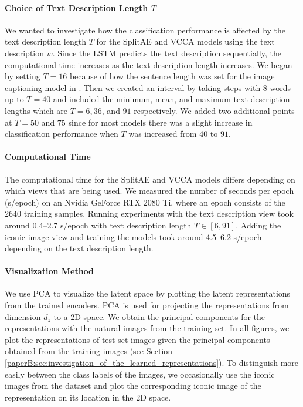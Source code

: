 \vspace{-3mm}
\paragraph{Choice of Text Description Length $T$} We wanted to investigate how the classification performance is affected by the text description length $T$ for the SplitAE and VCCA models using the text description $w$. Since the LSTM predicts the text description sequentially, the computational time increases as the text description length increases. We began by setting $T = 16$ because of how the sentence length was set for the image captioning model in . Then we created an interval by taking steps with 8 words up to $T=40$ and included the minimum, mean, and maximum text description lengths which are $T=6, 36$, and $91$ respectively. We added two additional points at $T=50$ and $75$ since for most models there was a slight increase in classification performance when $T$ was increased from $40$ to $91$. 

\vspace{-3mm}
\paragraph{Computational Time} The computational time for the SplitAE and VCCA models differs depending on which views that are being used. We measured the number of seconds per epoch (s/epoch) on an Nvidia GeForce RTX 2080 Ti, where an epoch consists of the 2640 training samples. Running experiments with the text description view 
took around 0.4--2.7 s/epoch with text description length $T \in [6, 91]$. Adding the iconic image view and training the models 
took around 4.5--6.2 s/epoch depending on the text description length.

\vspace{-3mm}
\paragraph{Visualization Method} We use PCA to visualize the latent space by plotting the latent representations from the trained encoders. PCA is used for projecting the representations from dimension $d_{z}$ to a 2D space. We obtain the principal components for the representations with the natural images from the training set. In all figures, we plot the representations of test set images given the principal components obtained from the training images (see Section \ref{paperB:sec:investigation_of_the_learned_representations}). %
To distinguish more easily between the class labels of the images, we occasionally use the iconic images from the dataset and plot the corresponding iconic image of the representation on its location in the 2D space.

